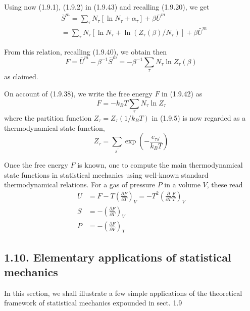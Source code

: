\documentclass{article}
\begin{document}
Using now (1.9.1), (1.9.2) in (1.9.43) and recalling (1.9.20), we get
$$
\begin{align*}
& \bar{S}^{m}=\sum_{\tau} N_{\tau}\left[\ln N_{\tau}+\alpha_{\tau}\right]+\beta \bar{U}^{m}  \tag{1.9.44}\\
&=\sum_{\tau} N_{\tau}\left[\ln N_{\tau}+\ln \left(Z_{\tau}(\beta) / N_{\tau}\right)\right]+\beta \bar{U}^{m}
\end{align*}
$$

From this relation, recalling (1.9.40), we obtain then
$$
\begin{equation*}
F=\bar{U}^{m}-\beta^{-1} \bar{S}^{m}=-\beta^{-1} \sum_{\tau} N_{\tau} \ln Z_{\tau}(\beta) \tag{1.9.45}
\end{equation*}
$$
as claimed.

On account of (1.9.38), we write the free energy $F$ in (1.9.42) as
$$
\begin{equation*}
F=-k_{B} T \sum_{\tau} N_{\tau} \ln Z_{\tau} \tag{1.9.46}
\end{equation*}
$$
where the partition function $Z_{\tau}=Z_{\tau}\left(1 / k_{B} T\right)$ in (1.9.5) is now regarded as a thermodynamical state function,
$$
\begin{equation*}
Z_{\tau}=\sum_{s^{\prime}} \exp \left(-\frac{e_{\tau s^{\prime}}}{k_{B} T}\right) \tag{1.9.47}
\end{equation*}
$$

Once the free energy $F$ is known, one to compute the main thermodynamical state functions in statistical mechanics using well-known standard thermodynamical relations. For a gas of pressure $P$ in a volume $V$, these read
$$
\begin{align*}
U & =F-T\left(\frac{\partial F}{\partial T}\right)_{V}=-T^{2}\left(\frac{\partial}{\partial T} \frac{F}{T}\right)_{V}  \tag{1.9.48}\\
S & =-\left(\frac{\partial F}{\partial T}\right)_{V}  \tag{1.9.49}\\
P & =-\left(\frac{\partial F}{\partial V}\right)_{T} \tag{1.9.50}
\end{align*}
$$

\subsection*{1.10. Elementary applications of statistical mechanics}

In this section, we shall illustrate a few simple applications of the theoretical framework of statistical mechanics expounded in sect. 1.9
\end{document}
